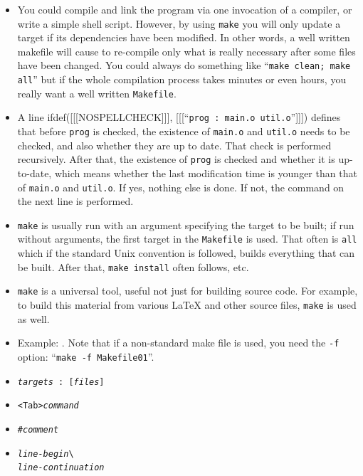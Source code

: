 \begin{itemize}
\item You could compile and link the program via one invocation of a compiler,
or write a simple shell script.  However, by using \texttt{make} you will only
update a target if its dependencies have been modified.  In other words, a well
written makefile will cause to re-compile only what is really necessary after
some files have been changed.  You could always do something like
``\texttt{make clean; make all}'' but if the whole compilation process takes
minutes or even hours, you really want a well written \texttt{Makefile}.
\item A line ifdef([[[NOSPELLCHECK]]], [[[``\verb#prog : main.o util.o#'']]])
defines that before \texttt{prog} is checked, the existence of
\texttt{main.o} and \texttt{util.o} needs to be checked, and also whether they
are up to date.  That check is performed recursively.  After that, the existence
of \texttt{prog} is checked and whether it is up-to-date, which means whether
the last modification time is younger than that of \texttt{main.o} and
\texttt{util.o}.  If yes, nothing else is done.  If not, the command on the next
line is performed.
\item \texttt{make} is usually run with an argument specifying the target to be
built; if run without arguments, the first target in the \texttt{Makefile} is
used.  That often is \texttt{all} which if the standard Unix convention is
followed, builds everything that can be built.  After that, \texttt{make
install} often follows, etc.
\item \texttt{make} is a universal tool, useful not just for building source
code.  For example, to build this material from various \LaTeX{} and other source
files, \texttt{make} is used as well.
\item Example: .  Note that if a non-standard
make file is used, you need the \texttt{-f} option: ``\texttt{make -f
Makefile01}''.
\end{itemize}


\begin{slide}
\begin{itemize}
\item {}
\texttt{\emph{targets} : [\emph{files}]}
\item {} \verb#<Tab>#\texttt{\emph{command}}
\item {} \texttt{\#\emph{comment}}
\item {}
\texttt{\emph{line-begin}}\verb#\#\\
\makebox[4cm][l]{~} \texttt{\emph{line-continuation}}
\end{itemize}
\end{slide}

